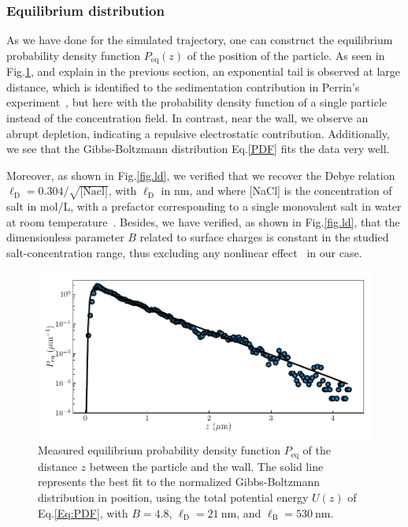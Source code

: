 \subsubsection{Equilibrium distribution}

As we have done for the simulated trajectory, one can construct the equilibrium probability density function $P_\mathrm{eq}(z)$ of the position of the particle. As seen in Fig.\ref{fig.pdf_exp}, and explain in the previous section, an exponential tail is observed at large distance, which is identified to the sedimentation contribution in Perrin's experiment~\cite{perrin_les_2014}, but here with the probability density function of a single particle instead of the concentration field. In contrast, near the wall, we observe an abrupt depletion, indicating a repulsive electrostatic contribution. Additionally, we see that the Gibbs-Boltzmann distribution Eq.\ref{PDF} fits the data very well.



Moreover, as shown in Fig.\ref{fig.ld}, we verified that we recover the Debye relation $\ell_{\mathrm{D}}=0.304/\sqrt{\textrm{[Nacl]}}$, with $\ell_{\mathrm{D}}$ in nm, and where [NaCl] is the concentration of salt in mol/L, with a prefactor corresponding to a single monovalent salt in water at room temperature~\cite{israelachvili_intermolecular_2015}. Besides, we have verified, as shown in Fig.\ref{fig.ld}, that the dimensionless parameter $B$ related to surface charges is constant in the studied salt-concentration range, thus excluding any nonlinear effect~\cite{wang_measurement_2011,oberholzer_grand_1997} in our case. 

\begin{figure}[h!]
	\centering
	\includegraphics{02_body/chapter3/images/trajctory_analysis/pdf_exp.pdf}
	\caption{Measured equilibrium probability density function $P_{\textrm{eq}}$ of the distance $z$ between the particle and the wall. The solid line represents the best fit to the normalized Gibbs-Boltzmann distribution in position, using the total potential energy $U(z)$ of Eq.\ref{Eq:PDF}, with $B = 4.8$, $\ell_\mathrm{D} = 21 ~ \mathrm{nm}$, and $\ell_\mathrm{B} = 530~ \mathrm{nm}$.}
	\label{fig.pdf_exp}
\end{figure}



